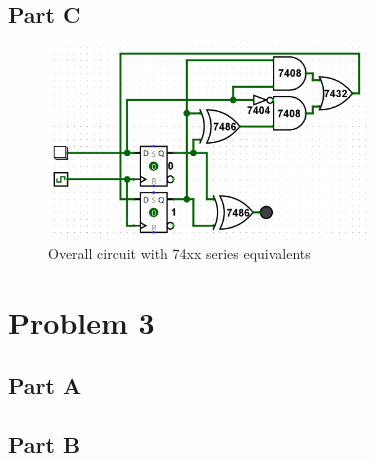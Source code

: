\documentclass{article}
\begin{document}
\subsection*{Part C}
\begin{figure}[H]
    \centering
    \includegraphics[width=0.75\textwidth]{./images/problem2_circ.png}
    \caption{Overall circuit with 74xx series equivalents}
\end{figure}

\newpage
\section*{Problem 3}

\subsection*{Part A}

\subsection*{Part B}
\end{document}
